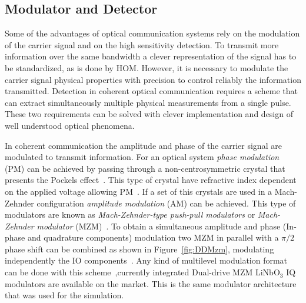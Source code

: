 \subsection{Modulator and Detector}\label{sec:moddet}
Some of the advantages of optical communication systems rely on the modulation of the carrier signal and on the high sensitivity detection. To transmit more information over the same bandwidth a clever representation of the signal has to be standardized, as is done by HOM. However, it is necessary to modulate the carrier signal physical properties with precision to control reliably the information transmitted. Detection in coherent optical communication requires a scheme that can extract simultaneously multiple physical measurements from a single pulse. These two requirements can be solved with clever implementation and design of well understood optical phenomena.

In coherent communication the amplitude and phase of the carrier signal are modulated to transmit information. For an optical system \textit{phase modulation} (PM) can be achieved by passing through a non-centrosymmetric crystal that presents the Pockels effect~\cite{FiberAgrawal,kikuchi2015fundamentals}. This type of crystal have refractive index dependent on the applied voltage allowing PM~\cite{kikuchi2015fundamentals}. If a set of this crystals are used in a Mach-Zehnder configuration \textit{amplitude modulation} (AM) can be achieved.  This type of modulators are known as \textit{Mach-Zehnder-type push-pull modulators} or \textit{Mach-Zehnder modulator} (MZM)~\cite{kikuchi2015fundamentals}. To obtain a simultaneous amplitude and phase (In-phase and quadrature components)  modulation two MZM in parallel with a $\pi/2$ phase shift can be combined as shown in Figure~\ref{fig:DDMzm}, modulating independently the IO  components~\cite{kikuchi2015fundamentals}. Any kind of multilevel modulation format can be done with this scheme~\cite{ho2005generation},currently  integrated Dual-drive MZM LiNbO$_3$ IQ modulators are available on the market. This is the same modulator architecture that was used for the simulation.   


